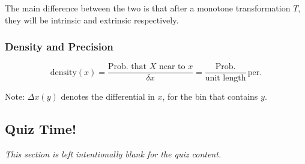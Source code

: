 The main difference between the two is that after a monotone transformation \( T \), they will be intrinsic and extrinsic respectively.

\subsubsection{Density and Precision}

\[ \text{density}(x) = \frac{\text{Prob. that } X \text{ near to } x}{\delta x} = \frac{\text{Prob.}}{\text{unit length}} \, \text{per.} \]

Note: \( \Delta x(y) \) denotes the differential in \( x \), for the bin that contains \( y \).

\subsection{Quiz Time!}

\emph{This section is left intentionally blank for the quiz content.}

